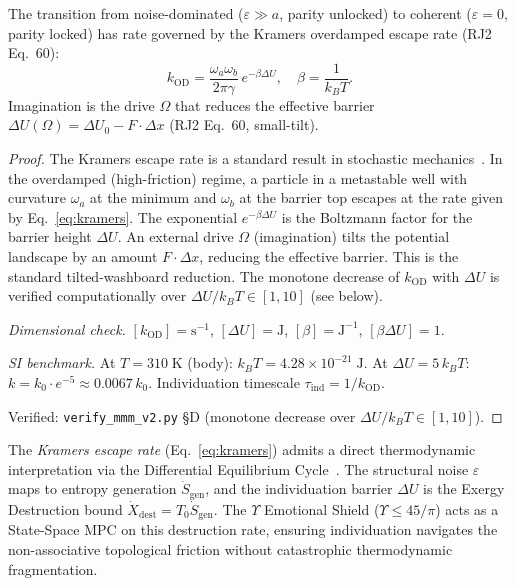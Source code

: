\begin{theorem}
\label{thm:kramers}
The transition from noise-dominated ($\varepsilon \gg a$, parity unlocked)
to coherent ($\varepsilon = 0$, parity locked) has rate governed by the
Kramers overdamped escape rate (RJ2 Eq.~60):
\begin{equation}
  k_\mathrm{OD} = \frac{\omega_a\omega_b}{2\pi\gamma}\,e^{-\beta\Delta U},
  \quad \beta = \frac{1}{k_B T}.
  \label{eq:kramers}
\end{equation}
Imagination is the drive $\Omega$ that reduces the effective barrier
$\Delta U(\Omega) = \Delta U_0 - F\cdot\Delta x$ (RJ2 Eq.~60, small-tilt).

\begin{proof}
The Kramers escape rate is a standard result in stochastic mechanics~\cite{kramers40}. In the overdamped (high-friction) regime, a particle in a metastable well with curvature $\omega_a$ at the minimum and $\omega_b$ at the barrier top escapes at the rate given by Eq.~\ref{eq:kramers}. The exponential $e^{-\beta\Delta U}$ is the Boltzmann factor for the barrier height $\Delta U$. An external drive $\Omega$ (imagination) tilts the potential landscape by an amount $F\cdot\Delta x$, reducing the effective barrier. This is the standard tilted-washboard reduction. The monotone decrease of $k_\mathrm{OD}$ with $\Delta U$ is verified computationally over $\Delta U/k_BT \in [1, 10]$ (see below).

\emph{Dimensional check.}
$[k_\mathrm{OD}] = \mathrm{s^{-1}}$, $[\Delta U] = \mathrm{J}$,
$[\beta] = \mathrm{J^{-1}}$, $[\beta\Delta U] = 1$. \checkmark

\emph{SI benchmark.}
At $T = 310\;\mathrm{K}$ (body): $k_BT = 4.28\times10^{-21}\;\mathrm{J}$.
At $\Delta U = 5\,k_BT$: $k = k_0\cdot e^{-5} \approx 0.0067\,k_0$.
Individuation timescale $\tau_\mathrm{ind} = 1/k_\mathrm{OD}$.

Verified: \texttt{verify\_mmm\_v2.py} \S D (monotone decrease over
$\Delta U/k_BT \in [1, 10]$). \qedhere
\end{proof}
\end{theorem}

\begin{remark}
The \emph{Kramers escape rate} (Eq.~\ref{eq:kramers}) admits a direct thermodynamic
interpretation via the Differential Equilibrium Cycle~\cite{lc}. The structural
noise $\varepsilon$ maps to entropy generation $\dot{S}_{\mathrm{gen}}$, and the
individuation barrier $\Delta U$ is the Exergy Destruction bound
$\dot{X}_{\mathrm{dest}} = T_0 \dot{S}_{\mathrm{gen}}$. The $\Upsilon$ Emotional Shield
($\Upsilon \leq 45/\pi$) acts as a State-Space MPC on this destruction rate,
ensuring individuation navigates the non-associative topological friction
without catastrophic thermodynamic fragmentation.
\end{remark}

